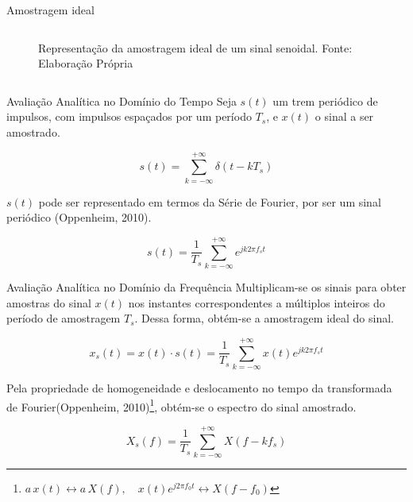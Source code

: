 \documentclass{beamer}
\begin{document}
\begin{frame}{Amostragem ideal}
\begin{columns}
\begin{figure}
            
            \caption{Representação da amostragem ideal de um sinal senoidal. Fonte: Elaboração Própria}
            
            \end{figure}
        
        \end{columns}
\end{frame}

\begin{frame}{Avaliação Analítica no Domínio do Tempo}
    Seja $s(t)$ um trem periódico de impulsos, com impulsos espaçados por um período $T_s$, e $x(t)$ o sinal a ser amostrado.

    \begin{equation}
        s(t) = \displaystyle\sum_{k = -\infty}^{+\infty}\delta(t-kT_s)
    \end{equation}

    $s(t)$ pode ser representado em termos da Série de Fourier, por ser um sinal periódico (Oppenheim, 2010).

    \begin{equation}
        s(t) = \frac{1}{T_s} \displaystyle\sum_{k = -\infty}^{+\infty}e^{jk2\pi f_st}
    \end{equation}

\end{frame}

\begin{frame}{Avaliação Analítica no Domínio da Frequência}
    Multiplicam-se os sinais para obter amostras do sinal $x(t)$ nos instantes correspondentes a múltiplos inteiros do período de amostragem $T_s$. Dessa forma, obtém-se a amostragem ideal do sinal.

    \begin{equation}
        x_s(t) = x(t) \cdot s(t) = \frac{1}{T_s}\displaystyle\sum_{k = -\infty}^{+\infty}x(t)e^{jk2\pi f_st}
    \end{equation}

Pela propriedade de homogeneidade e deslocamento no tempo da transformada de Fourier(Oppenheim, 2010)\footnote{$
a\,x(t) \leftrightarrow a\,X(f), \quad x(t)e^{j2\pi f_0t} \leftrightarrow X(f-f_0)$}, obtém-se o espectro do sinal amostrado.

    \begin{equation}
        X_s(f) = \frac{1}{T_s}\displaystyle\sum_{k = -\infty}^{+\infty}X(f-kf_s)
    \end{equation}

\end{frame}
\end{document}
